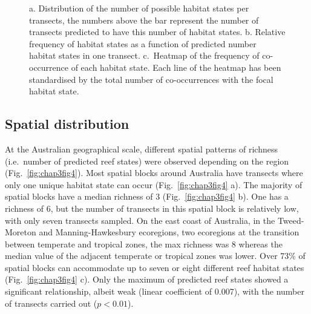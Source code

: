 \begin{refsection}
\begin{figure}
\caption[]{a. Distribution of the number of possible habitat states per
  transects, the numbers above the bar represent the number of transects
  predicted to have this number of habitat states. b. Relative frequency
  of habitat states as a function of predicted number habitat states in
  one transect. c.~Heatmap of the frequency of co-occurrence of each
  habitat state. Each line of the heatmap has been standardised by the
  total number of co-occurrences with the focal habitat
  state.}
\end{figure}

\hypertarget{spatial-distribution}{%
\subsection{Spatial distribution}\label{spatial-distribution}}

At the Australian geographical scale, different spatial patterns of
richness (i.e.~number of predicted reef states) were observed depending
on the region (Fig.~\ref{fig:chap3fig4}). Most spatial blocks around
Australia have transects where only one unique habitat state can occur
(Fig.~\ref{fig:chap3fig4} a). The majority of spatial blocks have a
median richness of 3 (Fig.~\ref{fig:chap3fig4} b). One has a richness of
6, but the number of transects in this spatial block is relatively low,
with only seven transects sampled. On the east coast of Australia, in
the Tweed-Moreton and Manning-Hawkesbury ecoregions, two ecoregions at
the transition between temperate and tropical zones, the max richness
was 8 whereas the median value of the adjacent temperate or tropical
zones was lower. Over 73\% of spatial blocks can accommodate up to seven
or eight different reef habitat states (Fig.~\ref{fig:chap3fig4} c).
Only the maximum of predicted reef states showed a significant
relationship, albeit weak (linear coefficient of 0.007), with the number
of transects carried out (\(p<0.01\)).


\end{refsection}
